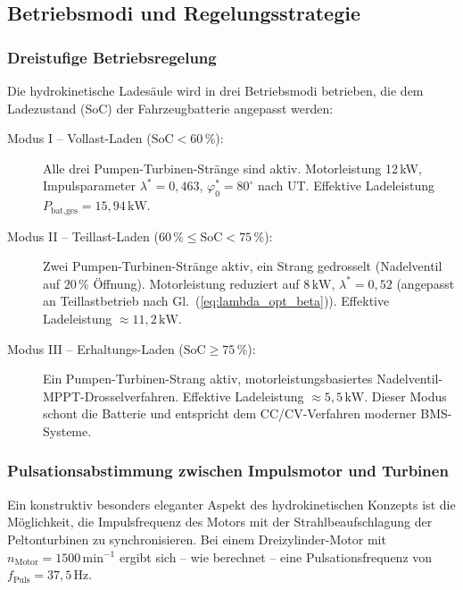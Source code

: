 ﻿\documentclass[a4paper,12pt]{article}
\begin{document}
\subsection{Betriebsmodi und Regelungsstrategie}

\subsubsection{Dreistufige Betriebsregelung}

Die hydrokinetische Ladesäule wird in drei Betriebsmodi betrieben, die
dem Ladezustand (SoC) der Fahrzeugbatterie angepasst werden:

\begin{description}
  \item[Modus I -- Vollast-Laden ($\text{SoC} < 60\,\%$):] Alle drei
    Pumpen-Turbinen-Stränge sind aktiv. Motorleistung 12\,kW,
    Impulsparameter $\lambda^* = 0{,}463$, $\varphi_0^* = 80^\circ$
    nach UT. Effektive Ladeleistung $P_\text{bat,ges} = 15{,}94\,\text{kW}$.
  \item[Modus II -- Teillast-Laden ($60\,\% \leq \text{SoC} < 75\,\%$):]
    Zwei Pumpen-Turbinen-Stränge aktiv, ein Strang gedrosselt (Nadelventil
    auf $20\,\%$ Öffnung). Motorleistung reduziert auf $8\,\text{kW}$,
    $\lambda^* = 0{,}52$ (angepasst an Teillastbetrieb nach
    Gl.~(\ref{eq:lambda_opt_beta})). Effektive Ladeleistung
    $\approx 11{,}2\,\text{kW}$.
  \item[Modus III -- Erhaltungs-Laden ($\text{SoC} \geq 75\,\%$):]
    Ein Pumpen-Turbinen-Strang aktiv, motorleistungsbasiertes Nadelventil-
    MPPT-Drosselverfahren. Effektive Ladeleistung $\approx 5{,}5\,\text{kW}$.
    Dieser Modus schont die Batterie und entspricht dem CC/CV-Verfahren
    moderner BMS-Systeme.
\end{description}

\subsubsection{Pulsationsabstimmung zwischen Impulsmotor und Turbinen}

Ein konstruktiv besonders eleganter Aspekt des hydrokinetischen Konzepts
ist die Möglichkeit, die Impulsfrequenz des Motors mit der Strahlbeaufschlagung
der Peltonturbinen zu synchronisieren. Bei einem Dreizylinder-Motor mit
$n_\text{Motor} = 1500\,\text{min}^{-1}$ ergibt sich -- wie berechnet --
eine Pulsationsfrequenz von $f_\text{Puls} = 37{,}5\,\text{Hz}$.
\end{document}

